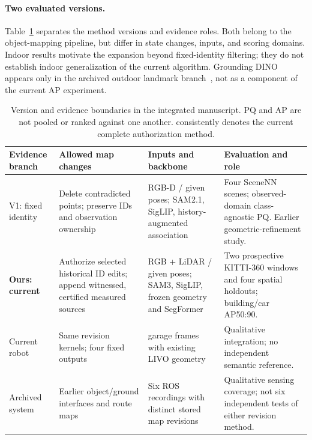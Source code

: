 \paragraph{Two evaluated versions.}
Table~\ref{tab:versions} separates the method versions and evidence roles. Both belong to the object-mapping pipeline, but differ in state changes, inputs, and scoring domains. Indoor results motivate the expansion beyond fixed-identity filtering; they do not establish indoor generalization of the current algorithm. Grounding DINO appears only in the archived outdoor landmark branch~\cite{gdino}, not as a component of the current AP experiment.

\begin{table}[t]
\centering\small
\setlength{\tabcolsep}{4pt}
\begin{tabular}{>{\raggedright\arraybackslash}p{}>{\raggedright\arraybackslash}p{}>{\raggedright\arraybackslash}p{}>{\raggedright\arraybackslash}p{}}
\toprule
Evidence branch & Allowed map changes & Inputs and backbone & Evaluation and role \\
\midrule
V1: fixed identity & Delete contradicted points; preserve IDs and observation ownership & RGB-D / given poses; SAM2.1, SigLIP, history-augmented association & Four SceneNN scenes; observed-domain class-agnostic PQ. Earlier geometric-refinement study. \\
\textbf{Ours: current} & Authorize selected historical ID edits; append witnessed, certified measured sources & RGB + LiDAR / given poses; SAM3, SigLIP, frozen geometry and SegFormer & Two prospective KITTI-360 windows and four spatial holdouts; building/car AP50:90. \\
Current robot & Same revision kernels; four fixed outputs & 330 garage frames with existing LIVO geometry & Qualitative integration; no independent semantic reference. \\
Archived system & Earlier object/ground interfaces and route maps & Six ROS recordings with distinct stored map revisions & Qualitative sensing coverage; not six independent tests of either revision method. \\
\bottomrule
\end{tabular}
\caption{Version and evidence boundaries in the integrated manuscript. PQ and AP are not pooled or ranked against one another. \ours{} consistently denotes the current complete authorization method.}
\label{tab:versions}
\end{table}
